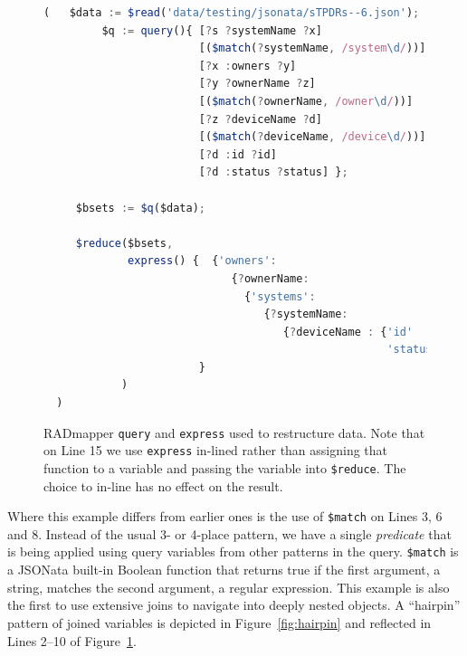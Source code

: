 \documentclass[9pt,letterpaper]{article}
\newcommand{\stt}[1]{\texttt{#1}} %
\begin{document}
\begin{figure}[H]
  \caption{RADmapper \stt{query} and \stt{express} used to restructure data.
    Note that on Line 15 we use \stt{express} in-lined rather than assigning that function to a variable and passing the variable into \stt{\$reduce}. The choice to in-line has no effect on the result.}
 \label{code:restruct}
\begin{lstlisting}[language=JavaScript,basicstyle=\ttfamily\scriptsize,numberstyle=\scriptsize]
  (   $data := $read('data/testing/jsonata/sTPDRs--6.json');
         $q := query(){ [?s ?systemName ?x]
                        [($match(?systemName, /system\d/))]
                        [?x :owners ?y]
                        [?y ?ownerName ?z]
                        [($match(?ownerName, /owner\d/))]
                        [?z ?deviceName ?d]
                        [($match(?deviceName, /device\d/))]
                        [?d :id ?id]
                        [?d :status ?status] };

     $bsets := $q($data);

     $reduce($bsets,
             express() {  {'owners':
                             {?ownerName:
                               {'systems':
                                  {?systemName:
                                     {?deviceName : {'id'     : ?id,
                                                     'status' : ?status}}}}}}
                        }
            )
  )
\end{lstlisting}
\end{figure} \vspace{-2em}

Where this example differs from earlier ones is the use of \stt{\$match} on Lines 3, 6 and 8.
Instead of the usual 3- or 4-place pattern, we have a single \textit{predicate} that is being applied using query variables from other patterns in the query.
\stt{\$match} is a JSONata built-in Boolean function that returns true if the first argument, a string, matches the second argument, a regular expression.
This example is also the first to use extensive joins to navigate into deeply nested objects.
A ``hairpin'' pattern of joined variables is depicted in Figure~\ref{fig:hairpin} and reflected in Lines 2--10 of Figure~\ref{code:restruct}.
\end{document}
